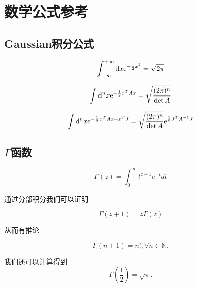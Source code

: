 \section{数学公式参考}
\subsection{Gaussian积分公式}
\begin{theorem}
    \begin{align}
        \int_{-\infty}^{+\infty}\mathrm d x\mathrm e^{-\frac12x^2}=\sqrt{2\pi}
    \end{align}
\end{theorem}
\begin{theorem}
    \begin{align}
        \int\mathrm d^nx\mathrm e^{-\frac12x^TAx}=\sqrt{\frac{(2\pi)^{n}}{\det A}}
    \end{align}
\end{theorem}
\begin{theorem}
    \begin{align}
        \int\mathrm d^nx\mathrm e^{-\frac12x^TAx+x^T J}=\sqrt{\frac{(2\pi)^{n}}{\det A}}\mathrm e^{\frac12 J^T A^{-1}J}
    \end{align}
\end{theorem}
\subsection{$\Gamma$函数}
\begin{definition}[$\Gamma$函数]
    \begin{equation}
        \Gamma(z) = \int_0^\infty t^{z-1}e^{-t}dt
    \end{equation}
\end{definition}
通过分部积分我们可以证明
\begin{theorem}
    \begin{equation}
        \Gamma(z+1) = z\Gamma(z)
    \end{equation}
\end{theorem}
从而有推论
\begin{theorem}
    \begin{equation}
        \Gamma(n+1)=n!, \forall n\in\mathbb N.
    \end{equation}
\end{theorem}

我们还可以计算得到
\begin{equation}
    \Gamma(\frac12)=\sqrt\pi.
\end{equation}

